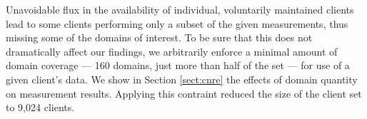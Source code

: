 Unavoidable flux in the availability of individual, voluntarily maintained
clients lead to some clients performing only a subset of the given
measurements, thus missing some of the domains of interest. To be sure that this
does not dramatically affect our findings, we arbitrarily enforce a minimal amount
of domain coverage --- 160 domains, just more than half of the set --- for use
of a given client's data. We show in Section \ref{sect:cnre} the effects of domain quantity
on measurement results. Applying this contraint reduced the size of the client
set to 9,024 clients.  

